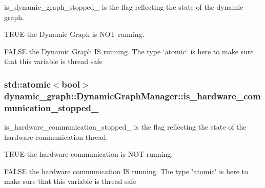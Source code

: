 is\+\_\+dynamic\+\_\+graph\+\_\+stopped\+\_\+ is the flag reflecting the state of the dynamic graph. 


\begin{DoxyItemize}
\item T\+R\+UE the Dynamic Graph is N\+OT running.
\item F\+A\+L\+SE the Dynamic Graph IS running. The type \char`\"{}atomic\char`\"{} is here to make sure that this variable is thread safe 
\end{DoxyItemize}
\subsubsection[{\texorpdfstring{is\+\_\+hardware\+\_\+communication\+\_\+stopped\+\_\+}{is_hardware_communication_stopped_}}]{\setlength{\rightskip}{0pt plus 5cm}std\+::atomic$<$bool$>$ dynamic\+\_\+graph\+::\+Dynamic\+Graph\+Manager\+::is\+\_\+hardware\+\_\+communication\+\_\+stopped\+\_\+\hspace{0.3cm}{\ttfamily [protected]}}\hypertarget{classdynamic__graph_1_1DynamicGraphManager_ab1a2bc0a8f04126638056f430297097e}{}\label{classdynamic__graph_1_1DynamicGraphManager_ab1a2bc0a8f04126638056f430297097e}


is\+\_\+hardware\+\_\+communication\+\_\+stopped\+\_\+ is the flag reflecting the state of the hardware communication thread. 


\begin{DoxyItemize}
\item T\+R\+UE the hardware communication is N\+OT running.
\item F\+A\+L\+SE the hardware communication IS running. The type \char`\"{}atomic\char`\"{} is here to make sure that this variable is thread safe 
\end{DoxyItemize}
